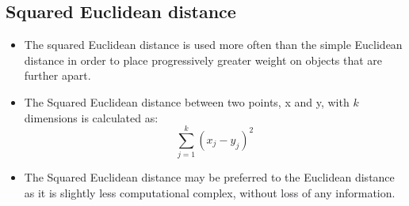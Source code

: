 \documentclass[a4paper,12pt]{report}
\begin{document}
\subsection{Squared Euclidean distance}

\begin{itemize}
\item The squared Euclidean distance is used more often than the simple Euclidean distance in order to place progressively greater weight on objects that are further apart. 


\item The Squared Euclidean distance between two points, x and y, with $k$ dimensions is calculated as:
\[ \sum^{k}_{j=1} ( x_j - y_j)^2  \]
\item The Squared Euclidean distance may be preferred to the Euclidean distance as it is slightly less computational complex, without loss of any information.
\end{itemize}



\end{document}
